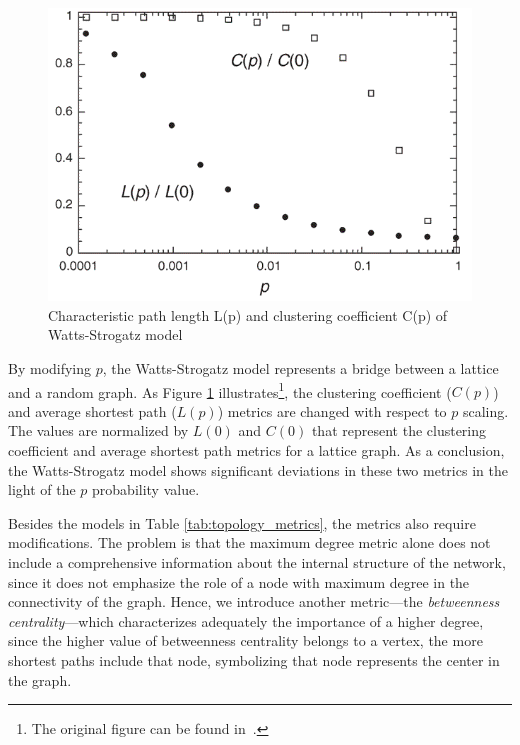 \begin{figure}[!ht]
	\centering
	\includegraphics[width=130mm, keepaspectratio]{figures/ws_metrics.png}
	\caption{Characteristic path length L(p) and clustering coefficient C(p) of Watts-Strogatz model}
	\label{fig:ws}
\end{figure}

By modifying $p$, the Watts-Strogatz model represents a bridge between a lattice and a random graph. As Figure \ref{fig:ws} illustrates\footnote{The original figure can be found in~\cite{ws_metrics}.}, the clustering coefficient ($C(p)$) and average shortest path ($L(p)$) metrics are changed with respect to $p$ scaling. The values are normalized by $L(0)$ and $C(0)$ that represent the clustering coefficient and average shortest path metrics for a lattice graph. As a conclusion, the Watts-Strogatz model shows significant deviations in these two metrics in the light of the $p$ probability value. 

Besides the models in Table \ref{tab:topology_metrics}, the metrics also require modifications. The problem is that the maximum degree metric alone does not include a comprehensive information about the internal structure of the network, since it does not emphasize the role of a node with maximum degree in the connectivity of the graph. Hence, we introduce another metric---the \textit{betweenness centrality}---which characterizes adequately the importance of a higher degree, since the higher value of betweenness centrality belongs to a vertex, the more shortest paths include that node, symbolizing that node represents the center in the graph.

